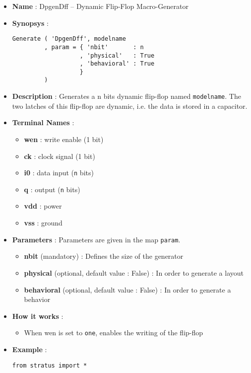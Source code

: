 \begin{itemize}
    \item \textbf{Name} : DpgenDff -- Dynamic Flip-Flop Macro-Generator
    \item \textbf{Synopsys} :
\begin{verbatim}
Generate ( 'DpgenDff', modelname
         , param = { 'nbit'       : n
                   , 'physical'   : True
                   , 'behavioral' : True         
                   }
         )
\end{verbatim}
    \item \textbf{Description} : Generates a n bits dynamic flip-flop named \verb-modelname-. The two latches of this flip-flop are dynamic, i.e. the data is stored in a capacitor.
    \item \textbf{Terminal Names} :
    \begin{itemize}
        \item \textbf{wen} : write enable (1 bit)
        \item \textbf{ck} : clock signal (1 bit)
        \item \textbf{i0} : data input (\verb-n- bits)
        \item \textbf{q} : output (\verb-n- bits)
        \item \textbf{vdd} : power
        \item \textbf{vss} : ground
    \end{itemize}
    \item \textbf{Parameters} : Parameters are given in the map \verb-param-.
    \begin{itemize}
        \item \textbf{nbit} (mandatory) : Defines the size of the generator
        \item \textbf{physical} (optional, default value : False) : In order to generate a layout
        \item \textbf{behavioral} (optional, default value : False) : In order to generate a behavior        
    \end{itemize}
    \item \textbf{How it works} : 
    \begin{itemize}
        \item When wen is set to \verb-one-, enables the writing of the flip-flop
    \end{itemize}    
    \item \textbf{Example} :
\begin{verbatim}
from stratus import *


\end{verbatim}
\end{itemize}
